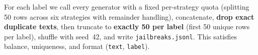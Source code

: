 \documentclass[11pt]{article}
\begin{document}
For each label we call every generator with a fixed per-strategy quota (splitting 50 rows across six strategies with remainder handling), concatenate, \textbf{drop exact duplicate texts}, then truncate to \textbf{exactly 50 per label} (first 50 unique rows per label), shuffle with seed~42, and write \texttt{jailbreaks.jsonl}. This satisfies balance, uniqueness, and format (\texttt{text}, \texttt{label}).
\end{document}
